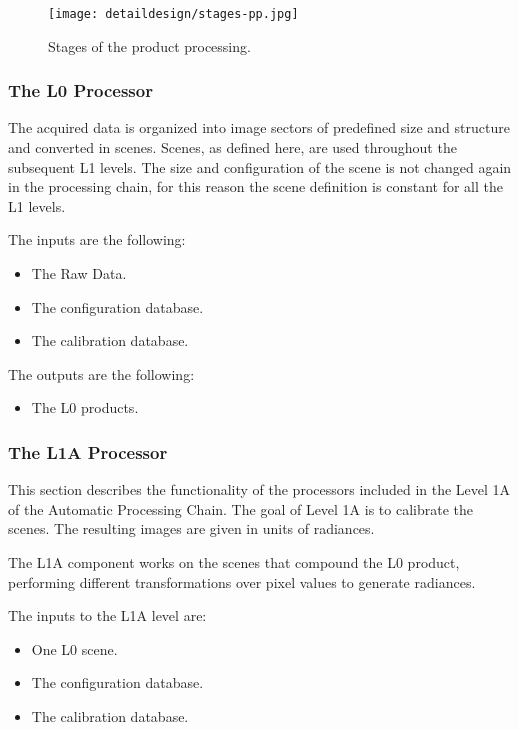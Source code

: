 \begin{enumerate}
\begin{figure}[!h]
\begin{center}
\texttt{[image: detaildesign/stages-pp.jpg]}
\caption{Stages of the product processing.}
\label{fig:cloud-states-pp}
\end{center}
\end{figure}

\subsubsection{The L0 Processor}

The acquired data is organized into image sectors of predefined size and structure and converted in scenes. Scenes, as defined here, are used throughout the subsequent L1 levels. The size and configuration of the scene is not changed again in the processing chain, for this reason the scene definition is constant for all the L1 levels.

The inputs are the following:
\begin{itemize}
\item The Raw Data.
\item The configuration database.
\item The calibration database.
\end{itemize}
The outputs are the following:
\begin{itemize}
\item The L0 products.
\end{itemize}

\subsubsection{The L1A Processor}

This section describes the functionality of the processors included in the Level 1A of the Automatic Processing Chain. The goal of Level 1A is to calibrate the scenes. The resulting images are given in units of radiances.

The L1A component works on the scenes that compound the L0 product, performing different transformations over pixel values to generate radiances.

The inputs to the L1A level are:
\begin{itemize}
\item One L0 scene.
\item The configuration database.
\item The calibration database.
\end{itemize}


\end{enumerate}
